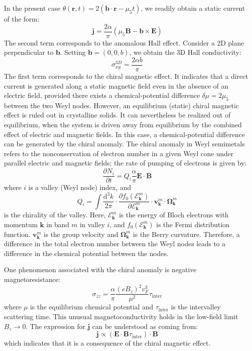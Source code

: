 In the present case $\theta(\bm{r}, t) = 2(\bm{b} \cdot \bm{r} - \mu_5 t)$, we readily obtain a static current of the form:
\begin{equation}
\bm{j} = \frac{2\alpha}{\pi} (\mu_5 \bm{B} - \bm{b} \times \bm{E})
\end{equation}
The second term corresponds to the anomalous Hall effect. Consider a 2D plane perpendicular to $\bm{b}$. Setting $\bm{b}=(0,0,b)$, we obtain the 3D Hall conductivity:
\begin{equation}
\sigma_{xy}^{3D} = \frac{2\alpha b}{\pi}
\end{equation}
The first term corresponds to the chiral magnetic effect. It indicates that a direct current is generated along a static magnetic field even in the absence of an electric field, provided there exists a chemical-potential difference $\delta\mu=2\mu_5$ between the two Weyl nodes. However, an equilibrium (static) chiral magnetic effect is ruled out in crystalline solids. It can nevertheless be realized out of equilibrium, when the system is driven away from equilibrium by the combined effect of electric and magnetic fields. In this case, a chemical-potential difference can be generated by the chiral anomaly. The chiral anomaly in Weyl semimetals refers to the nonconservation of electron number in a given Weyl cone under parallel electric and magnetic fields; the rate of pumping of electrons is given by:
\begin{equation}
\frac{\partial N_i}{\partial t} = Q_i \frac{\alpha}{\pi} \bm{E} \cdot \bm{B}
\end{equation}
where $i$ is a valley (Weyl node) index, and
\begin{equation}
Q_i = \int \frac{\mathrm{d}^3k}{2\pi} \cdot \frac{\partial f_0(\mathcal{E}_{\bm{k}}^m)}{\partial \mathcal{E}_{\bm{k}}^m} \cdot \bm{v}_{\bm{k}}^m \cdot \bm{\Omega}_{\bm{k}}^m
\end{equation}
is the chirality of the valley. Here, $\mathcal{E}_{\bm{k}}^m$ is the energy of Bloch electrons with momentum $\bm{k}$ in band $m$ in valley $i$, and $f_0(\mathcal{E}_{\bm{k}}^m)$ is the Fermi distribution function. $\bm{v}_{\bm{k}}^m$ is the group velocity and $\bm{\Omega}_{\bm{k}}^m$ is the Berry curvature. Therefore, a difference in the total electron number between the Weyl nodes leads to a difference in the chemical potential between the nodes.

One phenomenon associated with the chiral anomaly is negative magnetoresistance:
\begin{equation}
\sigma_{zz} = \frac{\alpha}{\pi} \frac{(e B_z)^2 v_F^3}{\mu^2} \tau_{\mathrm{inter}}
\end{equation}
where $\mu$ is the equilibrium chemical potential and $\tau_{\mathrm{inter}}$ is the intervalley scattering time. This unusual magnetoconductivity holds in the low-field limit $B_z \to 0$. The expression for $\bm{j}$ can be understood as coming from:
\begin{equation}
\bm{j} \propto (\bm{E} \cdot \bm{B} \tau_{\mathrm{inter}}) \cdot \bm{B}
\end{equation}
which indicates that it is a consequence of the chiral magnetic effect.